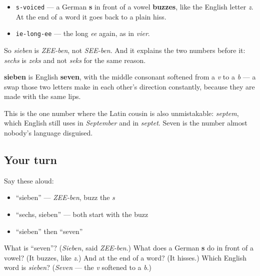 \begin{sounds}
\begin{itemize}
\raggedright
  \item \texttt{s-voiced} — a German \textbf{s} in front of a vowel \textbf{buzzes}, like the English letter \emph{z}. At the end of a word it goes back to a plain hiss.
  \item \texttt{ie-long-ee} — the long \emph{ee} again, as in \emph{vier}.
\end{itemize}

So \emph{sieben} is \emph{ZEE-ben}, not \emph{SEE-ben}. And it explains the two numbers before it: \emph{sechs} is \emph{zeks} and not \emph{seks} for the same reason.
\end{sounds}

\begin{cousinweb}
\textbf{sieben} is English \textbf{seven}, with the middle consonant softened from a \emph{v} to a \emph{b} — a swap those two letters make in each other's direction constantly, because they are made with the same lips.

This is the one number where the Latin cousin is also unmistakable: \emph{septem}, which English still uses in \emph{September} and in \emph{septet}. Seven is the number almost nobody's language disguised.
\end{cousinweb}

\subsection*{Your turn}
Say these aloud:

\begin{itemize}
\raggedright
  \item \textquotedblleft{}sieben\textquotedblright{} — \emph{ZEE-ben}, buzz the \emph{s}
  \item \textquotedblleft{}sechs, sieben\textquotedblright{} — both start with the buzz
  \item \textquotedblleft{}sieben\textquotedblright{} then \textquotedblleft{}seven\textquotedblright{}
\end{itemize}

\begin{tcolorbox}[breakable,colback=teal!4,colframe=teal!35!black,title={Before you move on}]
What is \textquotedblleft{}seven\textquotedblright{}? (\emph{Sieben}, said \emph{ZEE-ben}.) What does a German \textbf{s} do in front of a vowel? (It buzzes, like \emph{z}.) And at the end of a word? (It hisses.) Which English word is \emph{sieben}? (\emph{Seven} — the \emph{v} softened to a \emph{b}.)
\end{tcolorbox}
